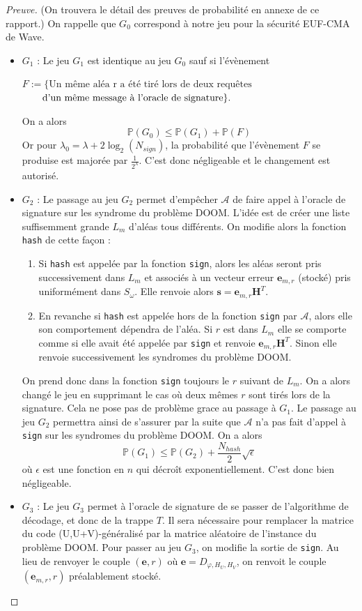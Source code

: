 \documentclass[12pt]{article}
\theoremstyle{plain}
\theoremstyle{definition}
\newcommand{\A}{\mathcal{A}}
\newcommand{\e}{\mathbf{e}}
\newcommand{\s}{\mathbf{s}}
\begin{document}
\begin{proof}[Preuve] (On trouvera le détail des preuves de probabilité en annexe de ce rapport.) On rappelle que $G_0$ correspond à notre jeu pour la sécurité EUF-CMA de Wave.
\begin{itemize} 
\item $G_1$ : Le jeu $G_1$ est identique au jeu $G_0$ sauf si l'évènement 
\begin{center}
$F := \{\text{Un même aléa r a été tiré lors de deux requêtes}$
$\text{\qquad d'un même message à l'oracle de signature}\}.$
\end{center}
On a alors 
$$ \mathbb{P}(G_0) \leq  \mathbb{P}(G_1) +  \mathbb{P}(F) $$
Or pour $\lambda_0=\lambda + 2\log_2(N_{sign})$, la probabilité que l'évènement $F$ se produise est majorée par $\frac{1}{2^{\lambda}}$. C'est donc négligeable et le changement est autorisé.
\item $G_2$ : Le passage au jeu $G_2$ permet d'empêcher $\A$ de faire appel à l'oracle de signature sur les syndrome du problème DOOM. L'idée est de créer une liste suffisemment grande $L_m$ d'aléas tous différents. On modifie alors la fonction \verb|hash| de cette façon :
	\begin{enumerate}
	\item Si \verb|hash| est appelée par la fonction \verb|sign|, alors les aléas seront pris successivement dans $L_m$ et associés à un vecteur erreur $\e_{m,r}$ (stocké) pris uniformément dans $S_{\omega}$. Elle renvoie alors $\s=\e_{m,r}\mathbf{H}^T$.
	\item En revanche si \verb|hash| est appelée hors de la fonction \verb|sign| par $\A$, alors elle son comportement dépendra de l'aléa. Si $r$ est dans $L_m$ elle se comporte comme si elle avait été appelée par \verb|sign| et renvoie $\e_{m,r}\mathbf{H}^T$. Sinon elle renvoie successivement les syndromes du problème DOOM.
	\end{enumerate}
On prend donc dans la fonction \verb|sign| toujours le $r$ suivant de $L_m$. On a alors changé le jeu en supprimant le cas où deux mêmes $r$ sont tirés lors de la signature. Cela ne pose pas de problème grace au passage à $G_1$. Le passage au jeu $G_2$ permettra ainsi de s'assurer par la suite que $\A$ n'a pas fait d'appel à \verb|sign| sur les syndromes du problème DOOM.
On a alors 
$$ \mathbb{P}(G_1) \leq  \mathbb{P}(G_2) +  \frac{N_{hash}}{2}\sqrt{\epsilon} $$
où $\epsilon$ est une fonction en $n$ qui décroît exponentiellement. C'est donc bien négligeable.
\item $G_3$ : Le jeu $G_3$ permet à l'oracle de signature de se passer de l'algorithme de décodage, et donc de la trappe $T$. Il sera nécessaire pour remplacer la matrice du code (U,U+V)-généralisé par la matrice aléatoire de l'instance du problème DOOM. Pour passer au jeu $G_3$, on modifie la sortie de \verb|sign|. Au lieu de renvoyer le couple $(\e,r)$ où $\e = D_{\varphi,H_U,H_V}$, on renvoit le couple $(\e_{m,r},r)$ préalablement stocké.\\

\end{itemize}
\end{proof}
\end{document}
